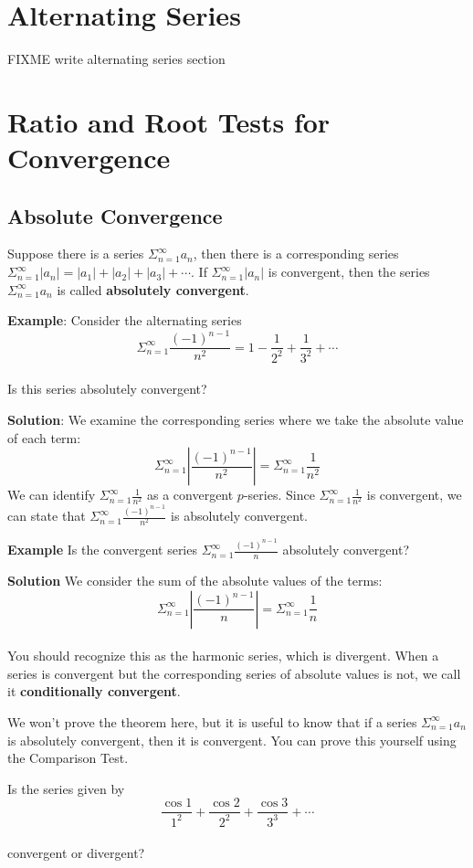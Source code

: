 \section{Alternating Series}
FIXME write alternating series section
\section{Ratio and Root Tests for Convergence}
\subsection{Absolute Convergence}
Suppose there is a series $\Sigma_{n=1}^\infty a_n$, then there is a 
corresponding series $\Sigma_{n=1}^\infty |a_n| = |a_1| + |a_2| + |a_3| + 
\cdots$. If $\Sigma_{n=1}^\infty |a_n|$ is convergent, then the series $\Sigma_
{n=1}^\infty a_n$ is called \textbf{absolutely convergent}. 

\textbf{Example}: Consider the alternating series 
$$\Sigma_{n=1}^\infty \frac{(-1)^{n-1}}{n^2} = 1 - \frac{1}{2^2} + 
\frac{1}{3^2} + \cdots$$\\
Is this series absolutely convergent?

\textbf{Solution}: We examine the corresponding series where we take the 
absolute value of each term:
$$\Sigma_{n=1}^\infty \left|\frac{(-1)^{n-1}}{n^2} \right| = \Sigma_{n=1}^
\infty \frac{1}{n^2}$$
We can identify $\Sigma_{n=1}^\infty \frac{1}{n^2}$ as a convergent $p$-series. 
Since $\Sigma_{n=1}^\infty \frac{1}{n^2}$ is convergent, we can state that 
$\Sigma_{n=1}^\infty \frac{(-1)^{n-1}}{n^2}$ is absolutely convergent. 

\textbf{Example} Is the convergent series $\Sigma_{n=1}^\infty 
\frac{(-1)^{n-1}}{n}$ absolutely convergent?

\textbf{Solution} We consider the sum of the absolute values of the terms:
$$\Sigma_{n=1}^\infty \left|\frac{(-1)^{n-1}}{n}\right| = \Sigma_{n=1}^\infty 
\frac{1}{n}$$\\
You should recognize this as the harmonic series, which is divergent. When a 
series is convergent but the corresponding series of absolute values is not, 
we call it \textbf{conditionally convergent}. 

We won't prove the theorem here, but it is useful to know that if a series 
$\Sigma_{n=1}^\infty a_n$ is absolutely convergent, then it is convergent. You 
can prove this yourself using the Comparison Test. 

\begin{Exercise}[label = absconv1]
Is the series given by 
$$\frac{\cos{1}}{1^2} + \frac{\cos{2}}{2^2} + \frac{\cos{3}}{3^3} + \cdots$$ \\
convergent or divergent?
\vspace{40mm}
\end{Exercise}

